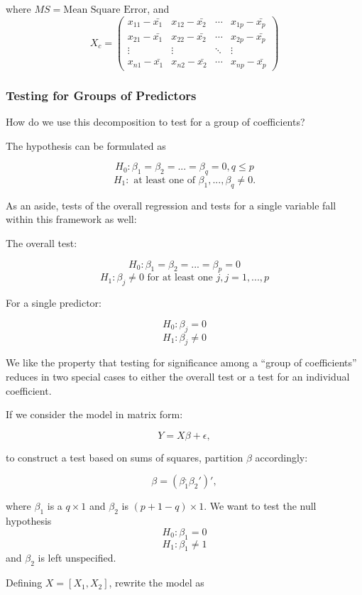 \documentclass[
  letterpaper,
  DIV=11,
  numbers=noendperiod]{scrreport}
\begin{document}
where \(MS = \text{Mean Square Error}\), and
\[X_c = \left( \begin{array}{cccc} 
x_{11}-\bar{x_1} & x_{12}- \bar{x_2} & \cdots & x_{1p}-\bar{x_p} \\ 
x_{21}-\bar{x_1} & x_{22}- \bar{x_2} & \cdots & x_{2p}-\bar{x_p} \\ 
\vdots & \vdots & \ddots & \vdots \\
x_{n1}-\bar{x_1} & x_{n2}- \bar{x_2} & \cdots & x_{np}-\bar{x_p} 
\end{array}\right)\]

\hypertarget{testing-for-groups-of-predictors}{%
\subsubsection{Testing for Groups of
Predictors}\label{testing-for-groups-of-predictors}}

How do we use this decomposition to test for a group of coefficients?

The hypothesis can be formulated as

\[H_0: \beta_1 = \beta_2 = ... = \beta_q = 0, q \leq p\]
\[H_1: \text{ at least one of } \beta_1, ..., \beta_q \neq 0.\]

As an aside, tests of the overall regression and tests for a single
variable fall within this framework as well:

The overall test:

\[H_0: \beta_1 = \beta_2 = ... = \beta_p = 0\]
\[H_1: \beta_j \neq 0 \text{ for at least one } j, j = 1,...,p\]

For a single predictor:

\[H_0: \beta_j = 0\] \[H_1: \beta_j \neq 0\]

We like the property that testing for significance among a ``group of
coefficients'' reduces in two special cases to either the overall test
or a test for an individual coefficient.

If we consider the model in matrix form:

\[Y = X\beta + \epsilon,\]

to construct a test based on sums of squares, partition \(\beta\)
accordingly:

\[\beta = (\beta_1^, \beta_2')',\]

where \(\beta_1\) is a \(q \times 1\) and \(\beta_2\) is
\((p+1-q) \times 1\). We want to test the null hypothesis
\[H_0: \beta_1 = 0\] \[H_1: \beta_1 \neq 1\] and \(\beta_2\) is left
unspecified.

Defining \(X = \left[ X_1, X_2 \right]\), rewrite the model as
\end{document}
